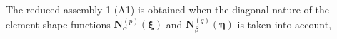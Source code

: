 \documentclass[oneside,onecolumn,10pt,final]{asme2ej}
\newcounter{tema}
\begin{document}
\noindent
The reduced assembly 1 (A1) is obtained when 
the diagonal nature of the element shape functions 
$\bm {N}_{\alpha}^{(p)} (\bm {\xi}) $ and 
$\bm {N}_{\beta}^{(q)} (\bm {\eta}) $ is taken into account,
%
\end{document}
